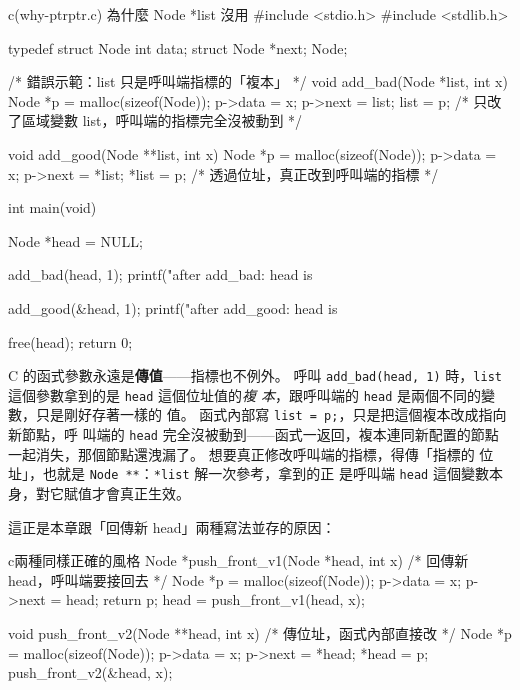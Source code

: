\begin{example}{c}{(why-ptrptr.c) 為什麼 Node *list 沒用}
#include <stdio.h>
#include <stdlib.h>

typedef struct Node {
    int data;
    struct Node *next;
} Node;

/* 錯誤示範：list 只是呼叫端指標的「複本」 */
void add_bad(Node *list, int x) {
    Node *p = malloc(sizeof(Node));
    p->data = x;
    p->next = list;
    list = p; /* 只改了區域變數 list，呼叫端的指標完全沒被動到 */
}

void add_good(Node **list, int x) {
    Node *p = malloc(sizeof(Node));
    p->data = x;
    p->next = *list;
    *list = p; /* 透過位址，真正改到呼叫端的指標 */
}

int main(void) {
    Node *head = NULL;

    add_bad(head, 1);
    printf("after add_bad:  head is %

    add_good(&head, 1);
    printf("after add_good: head is %

    free(head);
    return 0;
}
\end{example}


C 的函式參數永遠是\textbf{傳值}——指標也不例外。 呼叫 \texttt{add\_bad(head, 1)}
時，\texttt{list} 這個參數拿到的是 \texttt{head} 這個位址值的\textit{複
本}，跟呼叫端的 \texttt{head} 是兩個不同的變數，只是剛好存著一樣的
值。 函式內部寫 \texttt{list = p;}，只是把這個複本改成指向新節點，呼
叫端的 \texttt{head} 完全沒被動到——函式一返回，複本連同新配置的節點
一起消失，那個節點還洩漏了。 想要真正修改呼叫端的指標，得傳「指標的
位址」，也就是 \texttt{Node **}：\texttt{*list} 解一次參考，拿到的正
是呼叫端 \texttt{head} 這個變數本身，對它賦值才會真正生效。

這正是本章跟「回傳新 head」兩種寫法並存的原因：

\begin{code}{c}{兩種同樣正確的風格}
Node *push_front_v1(Node *head, int x) {   /* 回傳新 head，呼叫端要接回去 */
    Node *p = malloc(sizeof(Node));
    p->data = x;
    p->next = head;
    return p;
}
head = push_front_v1(head, x);

void push_front_v2(Node **head, int x) {   /* 傳位址，函式內部直接改 */
    Node *p = malloc(sizeof(Node));
    p->data = x;
    p->next = *head;
    *head = p;
}
push_front_v2(&head, x);
\end{code}

